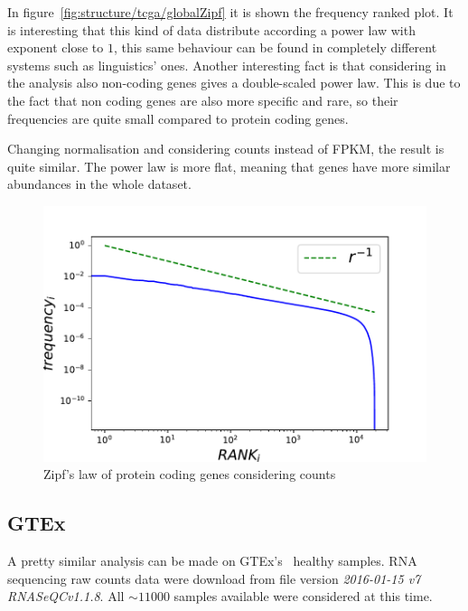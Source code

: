 In figure~\ref{fig:structure/tcga/globalZipf} it is shown the frequency ranked plot. It is interesting that this kind of data distribute according a power law with exponent close to $1$, this same behaviour can be found in completely different systems such as linguistics' ones. Another interesting fact is that considering in the analysis also non-coding genes gives a double-scaled power law. This is due to the fact that non coding genes are also more specific and rare, so their frequencies are quite small compared to protein coding genes.

Changing normalisation and considering counts instead of FPKM, the result is quite similar. The power law is more flat, meaning that genes have more similar abundances in the whole dataset. 
\begin{figure}
    \centering
    \includegraphics[width=0.8\linewidth]{pictures/structure/tcga/globalzipf_counts.pdf}
    \caption{Zipf's law of protein coding genes considering counts}
    \label{fig:structure/tcga/globalzipf_count}
\end{figure}

\subsection{GTEx}
A pretty similar analysis can be made on GTEx's~\cite{carithers2015novel} healthy samples. RNA sequencing raw counts data were download from file version \textit{2016-01-15 v7 RNASeQCv1.1.8}. All $\sim 11000$ samples available were considered at this time.

